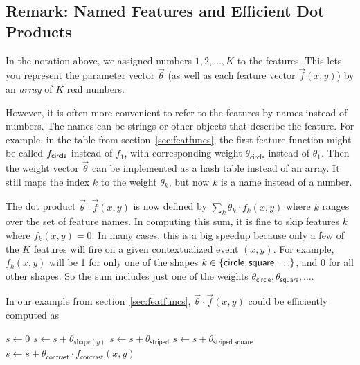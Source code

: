 \documentclass[11pt]{article}
\newcommand{\vtheta}{\vec{\theta}}
\begin{document}
\subsection{Remark: Named Features and Efficient Dot Products}

In the notation above, we assigned numbers $1,2,\ldots,K$ to the
features.  This lets you represent the parameter vector $\vtheta$
(as well as each feature vector $\vec{f}(x,y)$) by an {\em array} of
$K$ real numbers.

\medskip
However, it is often more convenient to refer to the features by names
instead of numbers.  The names can be strings or other objects that
describe the feature.  For example, in the table from
section~\ref{sec:featfuncs}, the first feature function might be
called $f_{\sf circle}$ instead of $f_1$, with corresponding weight
$\theta_{\textsf{circle}}$ instead of $\theta_1$.  Then the weight vector
$\vtheta$ can be implemented as a hash table instead of an array.  It
still maps the index $k$ to the weight $\theta_k$, but now $k$ is a
name instead of a number.

\medskip
The dot product $\vtheta \cdot \vec{f}(x,y)$ is now defined by
$\sum_k \theta_k \cdot f_k(x,y)$ where $k$ ranges over the set of
feature names.
In computing this sum, it is fine to skip features $k$ where $f_k(x,y)
= 0$.  In many cases, this is a big speedup because only a few of the
$K$ features will fire on a given contextualized event $(x,y)$.  For
example, $f_k(x,y)$ will be 1 for only one of the shapes $k \in \{{\sf
  circle}, {\sf square}, \ldots\}$, and 0 for all other shapes.  So the
sum includes just one of the weights $\theta_{\textsf{circle}},
\theta_{\textsf{square}}, \ldots$.

\medskip
In our example from section~\ref{sec:featfuncs}, $\vtheta \cdot \vec{f}(x,y)$ could be efficiently
computed as
\begin{algorithmic}
\State $s \gets 0$
\State $s \gets s + \theta_{\textrm{shape}(y)}$
  \State $s \gets s + \theta_{\textsf{striped}}$
    \State $s \gets s + \theta_{\textsf{striped square}}$
  \EndIf
\EndIf
\State $s \gets s + \theta_{\textsf{contrast}} \cdot f_{\textsf{contrast}}(x,y)
$
\end{algorithmic}
\end{document}
